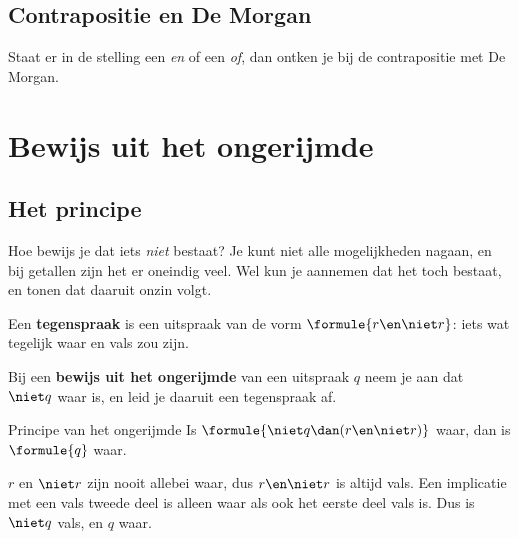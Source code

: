\subsection{Contrapositie en De Morgan}

Staat er in de stelling een \textit{en} of een \textit{of}, dan ontken je bij de contrapositie met De Morgan.


\begin{oefeningen}
\end{oefeningen}

\section{Bewijs uit het ongerijmde}\label{sec:h2-ongerijmde}

\subsection{Het principe}

Hoe bewijs je dat iets \textit{niet} bestaat? Je kunt niet alle mogelijkheden nagaan, en bij getallen zijn het er oneindig veel. Wel kun je aannemen dat het toch bestaat, en tonen dat daaruit onzin volgt.

\begin{theorie}
Een \textbf{\textcolor{accent}{tegenspraak}} is een uitspraak van de vorm $\formule{r \en \niet r}$: iets wat tegelijk waar en vals zou zijn.

\vspace{1mm}
Bij een \textbf{\textcolor{accent}{bewijs uit het ongerijmde}} van een uitspraak $q$ neem je aan dat $\niet q$ waar is, en leid je daaruit een tegenspraak af.

\begin{stelling}{Principe van het ongerijmde}
Is $\formule{\niet q \dan (r \en \niet r)}$ waar, dan is $\formule{q}$ waar.
\end{stelling}

\begin{bewijs}
$r$ en $\niet r$ zijn nooit allebei waar, dus $r \en \niet r$ is altijd vals. Een implicatie met een vals tweede deel is alleen waar als ook het eerste deel vals is. Dus is $\niet q$ vals, en $q$ waar.
\end{bewijs}
\end{theorie}


